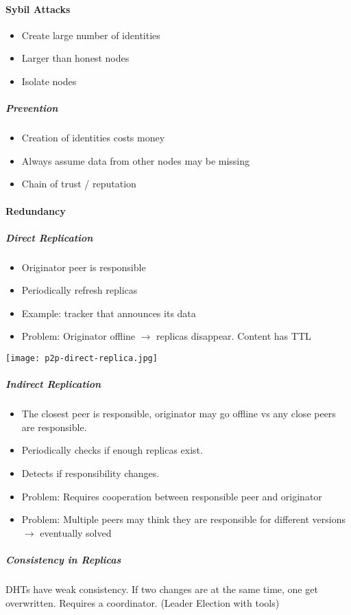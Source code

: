 \paragraph{Sybil Attacks}
\begin{itemize}
  \item Create large number of identities
  \item Larger than honest nodes
  \item Isolate nodes
\end{itemize}
\subparagraph{Prevention}
\begin{itemize}
  \item Creation of identities costs money
  \item Always assume data from other nodes may be missing
  \item Chain of trust / reputation
\end{itemize}

\paragraph{Redundancy}
\subparagraph{Direct Replication}
\begin{itemize}
  \item Originator peer is responsible
  \item Periodically refresh replicas
  \item Example: tracker that announces its data
  \item Problem: Originator offline $\rightarrow$ replicas disappear. Content has TTL
\end{itemize}
\texttt{[image: p2p-direct-replica.jpg]}

\subparagraph{Indirect Replication}
\begin{itemize}
  \item The closest peer is responsible, originator may go offline vs any close peers are responsible.
  \item Periodically checks if enough replicas exist.
  \item Detects if responsibility changes.
  \item Problem: Requires cooperation between responsible peer and originator
  \item Problem: Multiple peers may think they are responsible for different versions $\rightarrow$ eventually solved
\end{itemize}

\subparagraph{Consistency in Replicas}
DHTs have weak consistency. 
If two changes are at the same time, one get overwritten.
Requires a coordinator. (Leader Election with tools)

